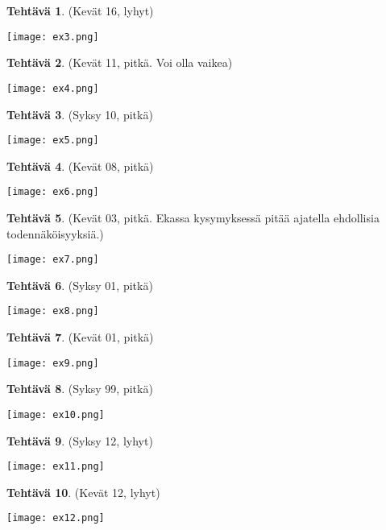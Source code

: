 \documentclass[12pt,leqno,a4paper,oneside]{amsart}
\theoremstyle{definition}
\newtheorem{exercise}{Tehtävä}
\theoremstyle{remark}
\numberwithin{equation}{section}
\begin{document}
\begin{exercise}
 (Kevät 16, lyhyt)
 
 \texttt{[image: ex3.png]}
\end{exercise}

\begin{exercise}
 (Kevät 11, pitkä. Voi olla vaikea)
 
 \texttt{[image: ex4.png]}
\end{exercise}

\begin{exercise}
 (Syksy 10, pitkä)
 
 \texttt{[image: ex5.png]}
\end{exercise}


\begin{exercise}
 (Kevät 08, pitkä)
 
 \texttt{[image: ex6.png]}
\end{exercise}


\begin{exercise}
 (Kevät 03, pitkä. Ekassa kysymyksessä pitää ajatella ehdollisia todennäköisyyksiä.)
 
 \texttt{[image: ex7.png]}
\end{exercise}

\begin{exercise}
 (Syksy 01, pitkä)
 
 \texttt{[image: ex8.png]}
\end{exercise}

\begin{exercise}
 (Kevät 01, pitkä)
 
 \texttt{[image: ex9.png]}
\end{exercise}

\begin{exercise}
 (Syksy 99, pitkä)
 
 \texttt{[image: ex10.png]}
\end{exercise}

\begin{exercise}
 (Syksy 12, lyhyt)
 
 \texttt{[image: ex11.png]}
\end{exercise}

\begin{exercise}
 (Kevät 12, lyhyt)
 
 \texttt{[image: ex12.png]}
\end{exercise}
\end{document}
